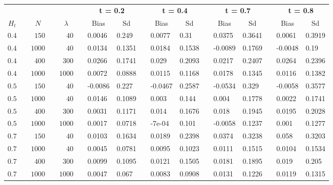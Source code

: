 \begin{table}[!tbp]
\begin{center}
\begin{tabular}{rcrcrcllcllcllcll}
\hline\hline
\multicolumn{1}{c}{\bfseries }&\multicolumn{1}{c}{\bfseries }&\multicolumn{1}{c}{\bfseries }&\multicolumn{1}{c}{\bfseries }&\multicolumn{1}{c}{\bfseries }&\multicolumn{1}{c}{\bfseries }&\multicolumn{2}{c}{\bfseries t = 0.2}&\multicolumn{1}{c}{\bfseries }&\multicolumn{2}{c}{\bfseries t = 0.4}&\multicolumn{1}{c}{\bfseries }&\multicolumn{2}{c}{\bfseries t = 0.7}&\multicolumn{1}{c}{\bfseries }&\multicolumn{2}{c}{\bfseries t = 0.8}\tabularnewline
\cline{7-8} \cline{10-11} \cline{13-14} \cline{16-17}
\multicolumn{1}{c}{$H_t$}&\multicolumn{1}{c}{}&\multicolumn{1}{c}{$N$}&\multicolumn{1}{c}{}&\multicolumn{1}{c}{$\lambda$}&\multicolumn{1}{c}{}&\multicolumn{1}{c}{Bias}&\multicolumn{1}{c}{Sd}&\multicolumn{1}{c}{}&\multicolumn{1}{c}{Bias}&\multicolumn{1}{c}{Sd}&\multicolumn{1}{c}{}&\multicolumn{1}{c}{Bias}&\multicolumn{1}{c}{Sd}&\multicolumn{1}{c}{}&\multicolumn{1}{c}{Bias}&\multicolumn{1}{c}{Sd}\tabularnewline
\hline
$0.4$&&$ 150$&&$  40$&&0.0046&0.249&&0.0077&0.31&&0.0375&0.3641&&0.0061&0.3919\tabularnewline
$0.4$&&$1000$&&$  40$&&0.0134&0.1351&&0.0184&0.1538&&-0.0089&0.1769&&-0.0048&0.19\tabularnewline
$0.4$&&$ 400$&&$ 300$&&0.0266&0.1741&&0.029&0.2093&&0.0217&0.2407&&0.0264&0.2396\tabularnewline
$0.4$&&$1000$&&$1000$&&0.0072&0.0888&&0.0115&0.1168&&0.0178&0.1345&&0.0116&0.1382\tabularnewline
$0.5$&&$ 150$&&$  40$&&-0.0086&0.227&&-0.0467&0.2587&&-0.0534&0.329&&-0.0058&0.3577\tabularnewline
$0.5$&&$1000$&&$  40$&&0.0146&0.1089&&0.003&0.144&&0.004&0.1778&&0.0022&0.1741\tabularnewline
$0.5$&&$ 400$&&$ 300$&&0.0031&0.1171&&0.014&0.1676&&0.018&0.1945&&0.0195&0.2028\tabularnewline
$0.5$&&$1000$&&$1000$&&0.0017&0.0718&&-7e-04&0.101&&-0.0058&0.1237&&0.001&0.1277\tabularnewline
$0.7$&&$ 150$&&$  40$&&0.0103&0.1634&&0.0189&0.2398&&0.0374&0.3238&&0.058&0.3203\tabularnewline
$0.7$&&$1000$&&$  40$&&0.0045&0.0781&&0.0095&0.1023&&0.0111&0.1515&&0.0104&0.1534\tabularnewline
$0.7$&&$ 400$&&$ 300$&&0.0099&0.1095&&0.0121&0.1505&&0.0181&0.1895&&0.019&0.205\tabularnewline
$0.7$&&$1000$&&$1000$&&0.0047&0.067&&0.0083&0.0908&&0.0131&0.1226&&0.0119&0.1315\tabularnewline
\hline
\end{tabular}\end{center}
\end{table}
